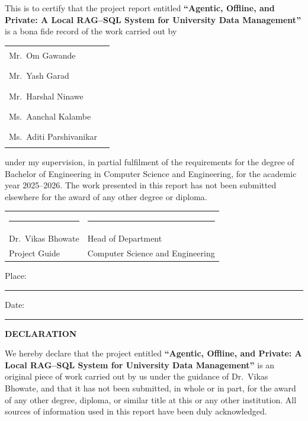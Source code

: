 \documentclass[11pt,a4paper,oneside]{report}
\newcommand{\ReportTitle}{Agentic, Offline, and Private: A Local RAG--SQL System for University Data Management}
\begin{document}
\noindent This is to certify that the project report entitled \textbf{``\ReportTitle''}
is a bona fide record of the work carried out by

\begin{center}
\begin{tabular}{ll}
Mr.\ Om Gawande & \rule{4cm}{0.4pt} \\[0.3cm]
Mr.\ Yash Garad & \rule{4cm}{0.4pt} \\[0.3cm]
Mr.\ Harshal Ninawe & \rule{4cm}{0.4pt} \\[0.3cm]
Ms.\ Aanchal Kalambe & \rule{4cm}{0.4pt} \\[0.3cm]
Ms.\ Aditi Parshivanikar & \rule{4cm}{0.4pt} \\[0.3cm]
\end{tabular}
\end{center}

\noindent under my supervision, in partial fulfilment of the requirements for
the degree of Bachelor of Engineering in Computer Science and Engineering, for
the academic year 2025--2026. The work presented in this report has not been
submitted elsewhere for the award of any other degree or diploma.

\vspace{2cm}
\begin{center}
\begin{tabular}{p{6cm}p{6cm}}
\rule{6cm}{0.4pt} & \rule{6cm}{0.4pt} \\
Dr.\ Vikas Bhowate & Head of Department \\
Project Guide & Computer Science and Engineering \\
\end{tabular}
\end{center}

\vspace{1.5cm}
\noindent Place: \rule{5cm}{0.4pt} \hfill Date: \rule{5cm}{0.4pt}

\clearpage

\thispagestyle{empty}
\begin{center}
{\Large \bfseries DECLARATION}
\end{center}
\vspace{1cm}

\noindent We hereby declare that the project entitled \textbf{``\ReportTitle''}
is an original piece of work carried out by us under the guidance of Dr.\ Vikas
Bhowate, and that it has not been submitted, in whole or in part, for the
award of any other degree, diploma, or similar title at this or any other
institution. All sources of information used in this report have been duly
acknowledged.
\end{document}
